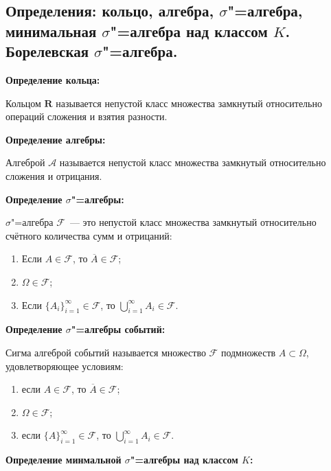 \subsection{Определения: кольцо, алгебра, $\sigma$"=алгебра, минимальная 
$\sigma$"=алгебра над классом $K$. Борелевская $\sigma$"=алгебра.}     

\textbf{Определение кольца:}
    \smallskip

    Кольцом $\mathbf{R}$ называется непустой класс множества
    замкнутый относительно операций сложения и взятия разности.
    \bigskip

\textbf{Определение алгебры:}
    \smallskip

    Алгеброй $\mathcal{A}$ называется непустой класс множества
    замкнутый относительно сложения и отрицания.
    \bigskip
    
\textbf{Определение $\sigma$"=алгебры:}
    \smallskip

    $\sigma$"=алгебра $\mathcal{F}$~--- это непустой класс множества
    замкнутый относительно счётного количества сумм и отрицаний:

    \begin{enumerate}
        \item{Если $A \in \mathcal{F}$, то $\overline{A} \in \mathcal{F}$;}
        \item{$\Omega \in \mathcal{F}$;}
        \item{Если $\{A_i\}^{\infty}_{i = 1} \in \mathcal{F}$,
        то $\bigcup^{\infty}_{i = 1} A_i \in \mathcal{F}$.}
    \end{enumerate}
    \bigskip

\textbf{Определение $\sigma$"=алгебры событий:}
    \smallskip

    Сигма алгеброй событий называется множество
    $\mathcal{F}$ подмножеств $A \subset \Omega$,
    удовлетворяющее условиям:

    \begin{enumerate}
        \item{если $A \in \mathcal{F}$, то
        $\overline{A} \in \mathcal{F}$;}
        \item{$\Omega \in \mathcal{F}$;}
        \item{если $\{A\}_{i = 1}^{\infty} \in
        \mathcal{F}$, то
        $\bigcup\limits_{i = 1}^{\infty} A_i \in 
        \mathcal{F}$.}
    \end{enumerate}
    \bigskip    

\textbf{Определение минмальной $\sigma$"=алгебры над классом $K$:}
    \smallskip
    
